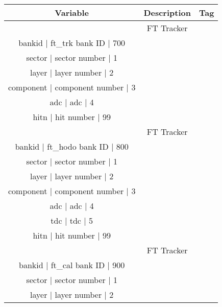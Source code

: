 \begin{table}[h]
	\begin{center}
		\begin{tabular}{| c | c | c |}
			\hline \hline
			Variable         & Description  & Tag  \\
			\hline
		         & FT Tracker  &   \\
                       bankid  |                                    ft_trk bank ID  |  700   \\
                       sector  |                                     sector number  |    1   \\
                        layer  |                                      layer number  |    2   \\
                    component  |                                  component number  |    3   \\
                          adc  |                                               adc  |    4   \\
                         hitn  |                                        hit number  |   99   \\
		         & FT Tracker  &   \\
                       bankid  |                                   ft_hodo bank ID  |  800   \\
                       sector  |                                     sector number  |    1   \\
                        layer  |                                      layer number  |    2   \\
                    component  |                                  component number  |    3   \\
                          adc  |                                               adc  |    4   \\
                          tdc  |                                               tdc  |    5   \\
                         hitn  |                                        hit number  |   99   \\
 		         & FT Tracker  &   \\
                      bankid  |                                    ft_cal bank ID  |  900   \\
					  sector  |                                     sector number  |    1   \\
				   	   layer  |                                      layer number  |    2   \\

\end{tabular}
\end{center}
\end{table}
